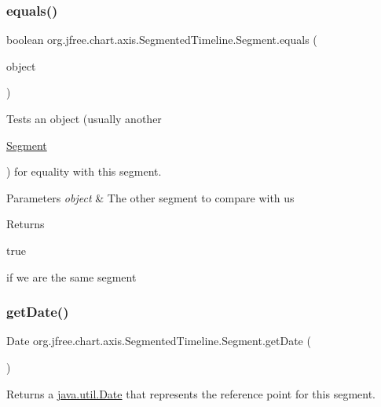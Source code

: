 \subsubsection{\texorpdfstring{equals()}{equals()}}
{\footnotesize\ttfamily boolean org.\+jfree.\+chart.\+axis.\+Segmented\+Timeline.\+Segment.\+equals (\begin{DoxyParamCaption}\item[{Object}]{object }\end{DoxyParamCaption})}

Tests an object (usually another
\begin{DoxyCode}
\mbox{\hyperlink{classorg_1_1jfree_1_1chart_1_1axis_1_1_segmented_timeline_1_1_segment_a9fbe203d339d0b02037dd6ea401dfde1}{Segment}} 
\end{DoxyCode}
 ) for equality with this segment.


\begin{DoxyParams}{Parameters}
{\em object} & The other segment to compare with us\\
\hline
\end{DoxyParams}
\begin{DoxyReturn}{Returns}

\begin{DoxyCode}
\textcolor{keyword}{true} 
\end{DoxyCode}
 if we are the same segment 
\end{DoxyReturn}
\mbox{\label{classorg_1_1jfree_1_1chart_1_1axis_1_1_segmented_timeline_1_1_segment_a498f7721a0a32dc5c6dc514fb91a1809}} 
\subsubsection{\texorpdfstring{get\+Date()}{getDate()}}
{\footnotesize\ttfamily Date org.\+jfree.\+chart.\+axis.\+Segmented\+Timeline.\+Segment.\+get\+Date (\begin{DoxyParamCaption}{ }\end{DoxyParamCaption})}

Returns a \mbox{\hyperlink{}{java.\+util.\+Date}} that represents the reference point for this segment.

